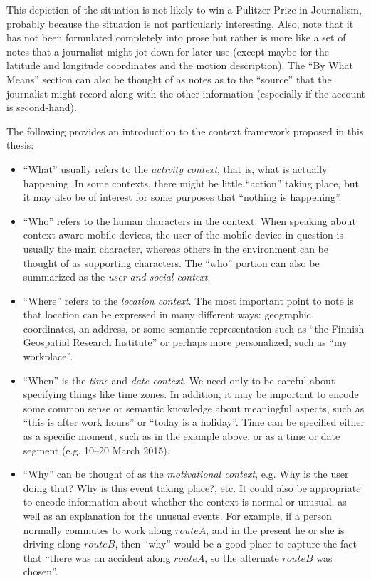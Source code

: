 This depiction of the situation is not likely to win a Pulitzer Prize in Journalism, probably because the situation is not particularly interesting. Also, note that it has not been formulated completely into prose but rather is more like a set of notes that a journalist might jot down for later use (except maybe for the latitude and longitude coordinates and the motion description). The ``By What Means'' section can also be thought of as notes as to the ``source'' that the journalist might record along with the other information (especially if the account is second-hand).

The following provides an introduction to the context framework proposed in this thesis:
%
\begin{itemize}
\item ``What'' usually refers to the \emph{activity context}, that is, what is actually happening. In some contexts, there might be little ``action'' taking place, but it may also be of interest for some purposes that ``nothing is happening''.
% 
\item ``Who'' refers to the human characters in the context. When speaking about context-aware mobile devices, the user of the mobile device in question is usually the main character, whereas others in the environment can be thought of as supporting characters. The ``who'' portion can also be summarized as the \emph{user and social context}. 
%
\item ``Where'' refers to the \emph{location context}. The most important point to note is that location can be expressed in many different ways: geographic coordinates, an address, or some semantic representation such as ``the Finnish Geospatial Research Institute'' or perhaps more personalized, such as ``my workplace''.
%
\item ``When'' is the \emph{time} and \emph{date context}. We need only to be careful about specifying things like time zones. In addition, it may be important to encode some common sense or semantic knowledge about meaningful aspects, such as ``this is after work hours'' or ``today is a holiday''. Time can be specified either as a specific moment, such as in the example above, or as a time or date segment (e.g. 10--20 March 2015).
%
\item ``Why'' can be thought of as the \emph{motivational context}, e.g. Why is the user doing that? Why is this event taking place?, etc. It could also be appropriate to encode information about whether the context is normal or unusual, as well as an explanation for the unusual events. For example, if a person normally commutes to work along $route A$, and in the present he or she is driving along $route B$, then ``why'' would be a good place to capture the fact that ``there was an accident along $route A$, so the alternate $route B$ was chosen''.

\end{itemize}
